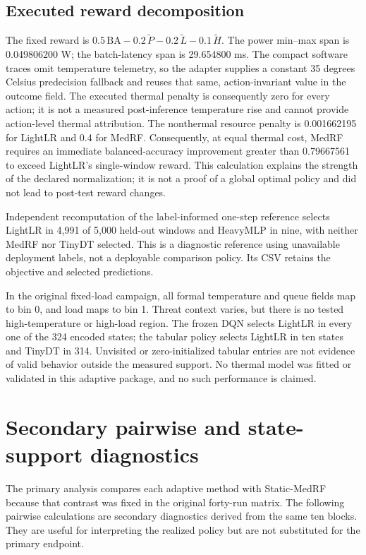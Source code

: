 \documentclass[10pt,a4paper]{article}
\begin{document}
\subsection{Executed reward decomposition}
The fixed reward is $0.5\,\mathrm{BA}-0.2\,\widetilde P-0.2\,\widetilde L-0.1\,\widetilde H$. The power min--max span is 0.049806200 W; the batch-latency span is 29.654800 ms. The compact software traces omit temperature telemetry, so the adapter supplies a constant 35 degrees Celsius predecision fallback and reuses that same, action-invariant value in the outcome field. The executed thermal penalty is consequently zero for every action; it is not a measured post-inference temperature rise and cannot provide action-level thermal attribution. The nonthermal resource penalty is 0.001662195 for LightLR and 0.4 for MedRF. Consequently, at equal thermal cost, MedRF requires an immediate balanced-accuracy improvement greater than 0.79667561 to exceed LightLR's single-window reward. This calculation explains the strength of the declared normalization; it is not a proof of a global optimal policy and did not lead to post-test reward changes.

Independent recomputation of the label-informed one-step reference selects LightLR in 4,991 of 5,000 held-out windows and HeavyMLP in nine, with neither MedRF nor TinyDT selected. This is a diagnostic reference using unavailable deployment labels, not a deployable comparison policy. Its CSV retains the objective and selected predictions.

In the original fixed-load campaign, all formal temperature and queue fields map to bin 0, and load maps to bin 1. Threat context varies, but there is no tested high-temperature or high-load region. The frozen DQN selects LightLR in every one of the 324 encoded states; the tabular policy selects LightLR in ten states and TinyDT in 314. Unvisited or zero-initialized tabular entries are not evidence of valid behavior outside the measured support. No thermal model was fitted or validated in this adaptive package, and no such performance is claimed.

\clearpage
\section{Secondary pairwise and state-support diagnostics}
The primary analysis compares each adaptive method with Static-MedRF because that contrast was fixed in the original forty-run matrix. The following pairwise calculations are secondary diagnostics derived from the same ten blocks. They are useful for interpreting the realized policy but are not substituted for the primary endpoint.
\end{document}

